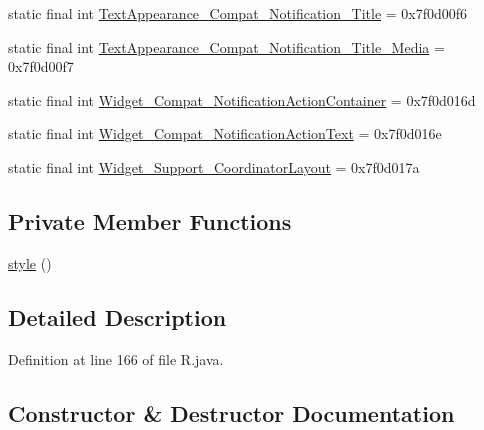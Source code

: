 \begin{DoxyCompactItemize}
\item 
static final int \mbox{\hyperlink{classcom_1_1jjoe64_1_1graphview_1_1_r_1_1style_aa3ad2702e1dbf0d9e4aa59399b74468d}{Text\+Appearance\+\_\+\+Compat\+\_\+\+Notification\+\_\+\+Title}} = 0x7f0d00f6
\item 
static final int \mbox{\hyperlink{classcom_1_1jjoe64_1_1graphview_1_1_r_1_1style_ab520ab7c71f2c20ecd212480a8251aac}{Text\+Appearance\+\_\+\+Compat\+\_\+\+Notification\+\_\+\+Title\+\_\+\+Media}} = 0x7f0d00f7
\item 
static final int \mbox{\hyperlink{classcom_1_1jjoe64_1_1graphview_1_1_r_1_1style_ae74a2788a037de150f156be1f266d331}{Widget\+\_\+\+Compat\+\_\+\+Notification\+Action\+Container}} = 0x7f0d016d
\item 
static final int \mbox{\hyperlink{classcom_1_1jjoe64_1_1graphview_1_1_r_1_1style_a088bb622a8b2b4a50924263f1470b909}{Widget\+\_\+\+Compat\+\_\+\+Notification\+Action\+Text}} = 0x7f0d016e
\item 
static final int \mbox{\hyperlink{classcom_1_1jjoe64_1_1graphview_1_1_r_1_1style_a8c4b92b0ea04897daa668bb79df7aa55}{Widget\+\_\+\+Support\+\_\+\+Coordinator\+Layout}} = 0x7f0d017a
\end{DoxyCompactItemize}
\subsection*{Private Member Functions}
\begin{DoxyCompactItemize}
\item 
\mbox{\hyperlink{classcom_1_1jjoe64_1_1graphview_1_1_r_1_1style_acb5ba81326f2a46e2940e7262a2559f6}{style}} ()
\end{DoxyCompactItemize}


\subsection{Detailed Description}


Definition at line 166 of file R.\+java.



\subsection{Constructor \& Destructor Documentation}
\mbox{\label{classcom_1_1jjoe64_1_1graphview_1_1_r_1_1style_acb5ba81326f2a46e2940e7262a2559f6}} 
